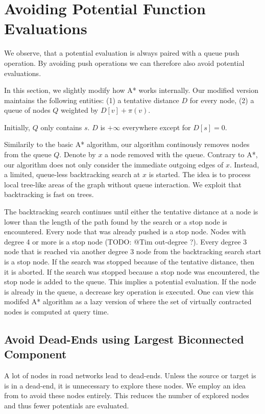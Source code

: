 \documentclass[a4paper,UKenglish,cleveref, autoref]{lipics-v2019}
\begin{document}
\section{Avoiding Potential Function Evaluations}

We observe, that a potential evaluation is always paired with a queue push operation.
By avoiding push operations we can therefore also avoid potential evaluations.

In this section, we slightly modify how A* works internally.
Our modified version maintains the following entities:
(1) a tentative distance $D$ for every node,
(2) a queue of nodes $Q$ weighted by $D[v]+\pi(v)$.

Initially, $Q$ only contains $s$.
$D$ is $+\infty$ everywhere except for $D[s]=0$.

Similarily to the basic A* algorithm, our algorithm continously removes nodes from the queue $Q$.
Denote by $x$ a node removed with the queue.
Contrary to A*, our algorithm does not only consider the immediate outgoing edges of $x$.
Instead, a limited, queue-less backtracking search at $x$ is started.
The idea is to process local tree-like areas of the graph without queue interaction.
We exploit that backtracking is fast on trees.

The backtracking search continues until either the tentative distance at a node is lower than the length of the path found by the search or a stop node is encountered.
Every node that was already pushed is a stop node.
Nodes with degree 4 or more is a stop node (TODO: @Tim out-degree ?).
Every degree 3 node that is reached via another degree 3 node from the backtracking search start is a stop node.
If the search was stopped because of the tentative distance, then it is aborted.
If the search was stopped because a stop node was encountered, the stop node is added to the queue.
This implies a potential evaluation.
If the node is already in the queue, a decrease key operation is executed.
One can view this modifed A* algorithm as a lazy version of \cite{topocore} where the set of virtually contracted nodes is computed at query time.

\subsection{Avoid Dead-Ends using Largest Biconnected Component}

A lot of nodes in road networks lead to dead-ends.
Unless the source or target is is in a dead-end, it is unnecessary to explore these nodes.
We employ an idea from \cite{TOPOCORE} to avoid these nodes entirely.
This reduces the number of explored nodes and thus fewer potentials are evaluated.
\end{document}
